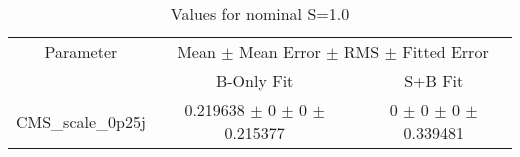 \begin{table}
\centering
\caption{Values for nominal S=1.0}
\begin{tabular}{ccc}
\toprule
Parameter 	& \multicolumn{2}{c}{Mean $\pm$ Mean Error $\pm$ RMS $\pm$ Fitted Error}\\
 	& B-Only Fit & S+B Fit\\
\midrule
CMS\_scale\_0p25j 	& \num{0.219638} $\pm$ \num{0} $\pm$ \num{0} $\pm$ \num{0.215377} 	& \num{0} $\pm$ \num{0} $\pm$ \num{0} $\pm$ \num{0.339481}\\
\bottomrule
\end{tabular}
\end{table}